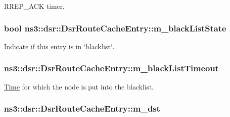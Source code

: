 R\+R\+E\+P\+\_\+\+A\+CK timer. 

\subsubsection[{\texorpdfstring{m\+\_\+black\+List\+State}{m_blackListState}}]{\setlength{\rightskip}{0pt plus 5cm}bool ns3\+::dsr\+::\+Dsr\+Route\+Cache\+Entry\+::m\+\_\+black\+List\+State\hspace{0.3cm}{\ttfamily [private]}}\hypertarget{classns3_1_1dsr_1_1DsrRouteCacheEntry_ac307e5506678f531af1f39627bba230f}{}\label{classns3_1_1dsr_1_1DsrRouteCacheEntry_ac307e5506678f531af1f39627bba230f}


Indicate if this entry is in \char`\"{}blacklist\char`\"{}. 

\subsubsection[{\texorpdfstring{m\+\_\+black\+List\+Timeout}{m_blackListTimeout}}]{ ns3\+::dsr\+::\+Dsr\+Route\+Cache\+Entry\+::m\+\_\+black\+List\+Timeout\hspace{0.3cm}{\ttfamily [private]}}\hypertarget{classns3_1_1dsr_1_1DsrRouteCacheEntry_aa4c08aa3d3815005c7c36a24f7e7d9f5}{}\label{classns3_1_1dsr_1_1DsrRouteCacheEntry_aa4c08aa3d3815005c7c36a24f7e7d9f5}


\hyperlink{classns3_1_1Time}{Time} for which the node is put into the blacklist. 

\subsubsection[{\texorpdfstring{m\+\_\+dst}{m_dst}}]{ ns3\+::dsr\+::\+Dsr\+Route\+Cache\+Entry\+::m\+\_\+dst\hspace{0.3cm}{\ttfamily [private]}}\hypertarget{classns3_1_1dsr_1_1DsrRouteCacheEntry_a5c582e9df674d453f476faec4834bb97}{}\label{classns3_1_1dsr_1_1DsrRouteCacheEntry_a5c582e9df674d453f476faec4834bb97}


